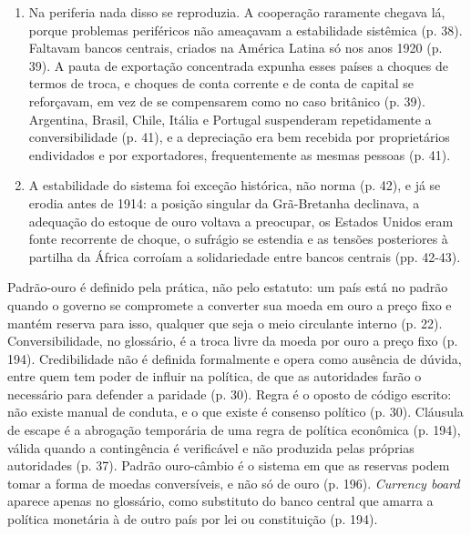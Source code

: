 \begin{enumerate}[leftmargin=*,nosep]
Banco da França e obteve promessa de 1,5 milhão da Rússia (p. 34). Seguiram-se
episódios em 1893, 1898, 1906, 1907, 1909 e 1910, e o autor conclui que a
sobrevivência do sistema dependia da colaboração entre bancos centrais e
governos, não de automatismo (p. 35). Cláusulas de escape permitiam suspender a
conversibilidade em circunstância verificável e alheia à vontade das autoridades
sem destruir a credibilidade do compromisso em tempos normais (p. 37).
\item Na periferia nada disso se reproduzia. A cooperação raramente chegava lá,
porque problemas periféricos não ameaçavam a estabilidade sistêmica (p. 38).
Faltavam bancos centrais, criados na América Latina só nos anos 1920 (p. 39). A
pauta de exportação concentrada expunha esses países a choques de termos de
troca, e choques de conta corrente e de conta de capital se reforçavam, em vez
de se compensarem como no caso britânico (p. 39). Argentina, Brasil, Chile,
Itália e Portugal suspenderam repetidamente a conversibilidade (p. 41), e a
depreciação era bem recebida por proprietários endividados e por exportadores,
frequentemente as mesmas pessoas (p. 41).
\item A estabilidade do sistema foi exceção histórica, não norma (p. 42), e já
se erodia antes de 1914: a posição singular da Grã-Bretanha declinava, a
adequação do estoque de ouro voltava a preocupar, os Estados Unidos eram fonte
recorrente de choque, o sufrágio se estendia e as tensões posteriores à partilha
da África corroíam a solidariedade entre bancos centrais (pp. 42-43).
\end{enumerate}

Padrão-ouro é definido pela prática, não pelo estatuto: um país está no padrão
quando o governo se compromete a converter sua moeda em ouro a preço fixo e
mantém reserva para isso, qualquer que seja o meio circulante interno (p. 22).
Conversibilidade, no glossário, é a troca livre da moeda por ouro a preço fixo
(p. 194). Credibilidade não é definida formalmente e opera como ausência de
dúvida, entre quem tem poder de influir na política, de que as autoridades farão
o necessário para defender a paridade (p. 30). Regra é o oposto de código
escrito: não existe manual de conduta, e o que existe é consenso político
(p. 30). Cláusula de escape é a abrogação temporária de uma regra de política
econômica (p. 194), válida quando a contingência é verificável e não produzida
pelas próprias autoridades (p. 37). Padrão ouro-câmbio é o sistema em que as
reservas podem tomar a forma de moedas conversíveis, e não só de ouro (p. 196).
\emph{Currency board} aparece apenas no glossário, como substituto do banco
central que amarra a política monetária à de outro país por lei ou constituição
(p. 194).

